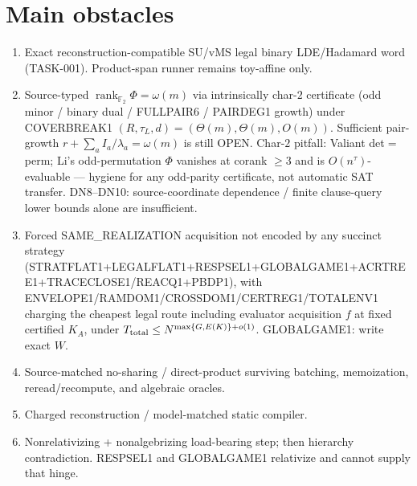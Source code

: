 \documentclass[11pt]{article}
\begin{document}
\section*{Main obstacles}
\begin{enumerate}
\item Exact reconstruction-compatible SU/vMS legal binary LDE/Hadamard word
(TASK-001). Product-span runner remains toy-affine only.
\item Source-typed $\operatorname{rank}_{\mathbb F_2}\Phi=\omega(m)$ via
intrinsically char-$2$ certificate (odd minor / binary dual / FULLPAIR6 /
PAIRDEG1 growth) under COVERBREAK1
$(R,\tau_L,d)=(\Theta(m),\Theta(m),O(m))$. Sufficient pair-growth
$r+\sum_a I_a/\lambda_a=\omega(m)$ is still OPEN. Char-$2$ pitfall: Valiant
det$=$perm; Li's odd-permutation $\Phi$ vanishes at corank $\ge 3$ and is
$O(n^{\tau})$-evaluable --- hygiene for any odd-parity certificate, not
automatic SAT transfer. DN8--DN10: source-coordinate dependence / finite
clause-query lower bounds alone are insufficient.
\item Forced SAME\_REALIZATION acquisition not encoded by any succinct strategy
(STRATFLAT1+LEGALFLAT1+RESPSEL1+GLOBALGAME1+ACRTREE1+TRACECLOSE1/REACQ1+PBDP1),
with ENVELOPE1/RAMDOM1/CROSSDOM1/CERTREG1/TOTALENV1 charging the cheapest legal
route including evaluator acquisition $f$ at fixed certified $K_A$, under
$T_{\rm total}\le N^{\max\{G,E(K)\}+o(1)}$. GLOBALGAME1: write exact $W$.
\item Source-matched no-sharing / direct-product surviving batching, memoization,
reread/recompute, and algebraic oracles.
\item Charged reconstruction / model-matched static compiler.
\item Nonrelativizing + nonalgebrizing load-bearing step; then hierarchy
contradiction. RESPSEL1 and GLOBALGAME1 relativize and cannot supply that hinge.
\end{enumerate}
\end{document}
